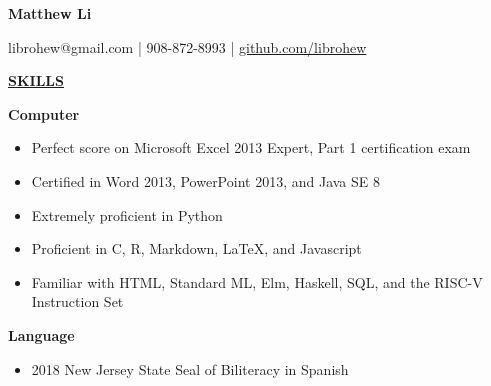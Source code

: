 \documentclass[
]{article}
\author{}
\date{\vspace{-2.5em}}
\providecommand{\tightlist}{%
  \setlength{\itemsep}{0pt}\setlength{\parskip}{0pt}}
\begin{document}

\begin{center}

\textbf{Matthew Li}

\end{center}

\begin{center}
librohew@gmail.com | 908-872-8993 | \href{https://www.github.com/librohew}{github.com/librohew}   
\end{center}

\textbf{\underline{SKILLS}}

\textbf{Computer}

\begin{itemize}
\item
  Perfect score on Microsoft Excel 2013 Expert, Part 1 certification
  exam
\item
  Certified in Word 2013, PowerPoint 2013, and Java SE 8
\end{itemize}

\begin{itemize}
\item
  Extremely proficient in Python
\item
  Proficient in C, R, Markdown, LaTeX, and Javascript
\item
  Familiar with HTML, Standard ML, Elm, Haskell, SQL, and the RISC-V
  Instruction Set
\end{itemize}

\textbf{Language}

\begin{itemize}
\item
  2018 New Jersey State Seal of Biliteracy in Spanish
\end{itemize}





\end{document}
